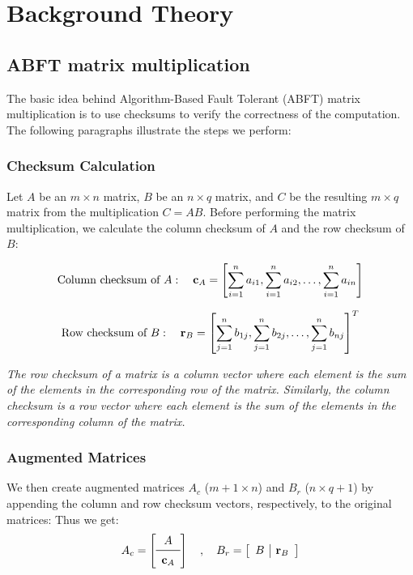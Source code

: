 \section{Background Theory}
\label{sec:background}

\subsection{ABFT matrix multiplication}

The basic idea behind Algorithm-Based Fault Tolerant (ABFT) matrix multiplication
is to use checksums to verify the correctness of the computation.
The following paragraphs illustrate the steps we perform:

\subsubsection{Checksum Calculation}
Let \( A \) be an \( m \times n \) matrix,
\( B \) be an \( n \times q \) matrix,
and \( C \) be the resulting \( m \times q \) matrix
from the multiplication \( C = A B \).
Before performing the matrix multiplication,
we calculate the column checksum of \( A \) and the row checksum of \( B \):

\[
	\textnormal{Column checksum of } A: \quad
	\mathbf{c}_A =
	\left[
		\sum_{i=1}^{n} a_{i1},
		\sum_{i=1}^{n} a_{i2},
		\ldots, \sum_{i=1}^{n} a_{in}
		\right]
\]

\[
	\textnormal{Row checksum of } B: \quad
	\mathbf{r}_B = \left[ \sum_{j=1}^{n} b_{1j}, \sum_{j=1}^{n} b_{2j}, \ldots, \sum_{j=1}^{n} b_{nj} \right]^T
\]

\textit{
	The row checksum of a matrix is a column vector where each element
	is the sum of the elements in the corresponding row of the matrix.
	Similarly, the column checksum is a row vector where
	each element is the sum of the elements in the corresponding column of the matrix.}

\subsubsection{Augmented Matrices}

We then create augmented matrices $A_{c}$ (\( m+1 \times n \)) and $B_{r}$ (\( n \times q+1 \))
by appending the column and row checksum vectors, respectively, to the original matrices:
Thus we get:
\[
	A_{c} =
	\left[
		\begin{array}{c}
			A \\
			\midrule
			\mathbf{c}_A
		\end{array}
		\right]
	\quad
	,
	\quad
	B_{r} = \left[
		\begin{array}{c|c}
			B &
			\mathbf{r}_B
		\end{array}
		\right]
\]

